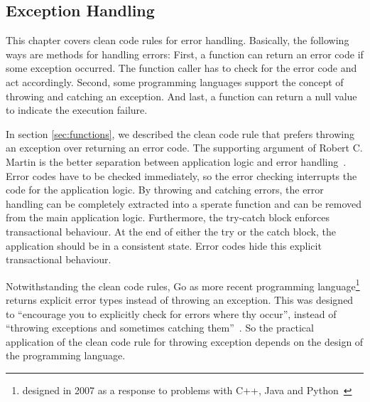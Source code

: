 \subsection{Exception Handling}\label{sec:background:returning_none_and_error_handling}
This chapter covers clean code rules for error handling. Basically, the following ways are methods for handling errors:
First, a function can return an error code if some exception occurred. The function caller has to check for the error code and act accordingly. Second, some programming languages support the concept of throwing and catching an exception. And last, a function can return a null value to indicate the execution failure. 

In section \ref{sec:functions}, we described the clean code rule that prefers throwing an exception over returning an error code. The supporting argument of Robert C. Martin is the better separation between application logic and error handling~\cite{martin_clean_2009}. Error codes have to be checked immediately, so the error checking interrupts the code for the application logic. By throwing and catching errors, the error handling can be completely extracted into a sperate function and can be removed from the main application logic. Furthermore, the try-catch block enforces transactional behaviour. At the end of either the try or the catch block, the application should be in a consistent state. Error codes hide this explicit transactional behaviour. 

Notwithstanding the clean code rules, Go as more recent programming language\footnote{designed in 2007 as a response to problems with C++, Java and Python~\cite{noauthor_go_nodate}} returns explicit error types instead of throwing an exception. This was designed to \enquote{encourage you to explicitly check for errors where thy occur}, instead of \enquote{throwing exceptions and sometimes catching them}~\cite{gerrand_error_2011}.   
So the practical application of the clean code rule for throwing exception depends on the design of the programming language.

